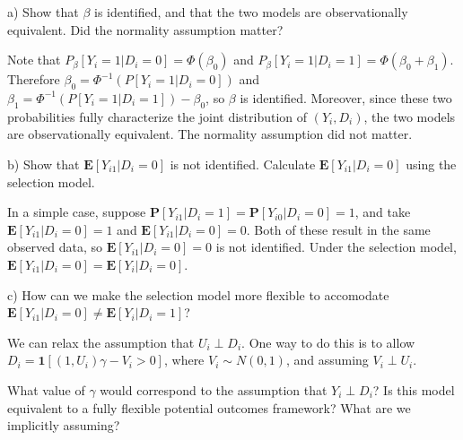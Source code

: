 \documentclass[12pt,english]{article}
\begin{document}
a) Show that $\beta$ is identified, and that the two models are observationally equivalent. Did the normality assumption matter?
\vspace{1em}

Note that $P_{\beta}[Y_{i} = 1 | D_{i} = 0] = \Phi(\beta_{0})$ and $P_{\beta}[Y_{i} = 1 | D_{i} = 1] = \Phi(\beta_{0} + \beta_{1})$. Therefore $\beta_{0} = \Phi^{-1}(P[Y_{i} = 1 | D_{i} = 0])$ and $\beta_{1} = \Phi^{-1}(P[Y_{i} = 1 | D_{i} = 1]) - \beta_{0}$, so $\beta$ is identified. Moreover, since these two probabilities fully characterize the joint distribution of $(Y_{i}, D_{i})$, the two models are observationally equivalent. The normality assumption did not matter.

\vspace{1em}
b) Show that $\mathbf{E}[Y_{i1} | D_{i} = 0]$ is not identified. Calculate $\mathbf{E}[Y_{i1} | D_{i} = 0]$ using the selection model.
\vspace{1em}

In a simple case, suppose $\mathbf{P}[Y_{i1} | D_{i} = 1] = \mathbf{P}[Y_{i0} | D_{i} = 0] = 1$, and take $\mathbf{E}[Y_{i1} | D_{i} = 0] = 1$ and $\mathbf{E}[Y_{i1} | D_{i} = 0] = 0$. Both of these result in the same observed data, so $\mathbf{E}[Y_{i1} | D_{i} = 0] = 0$ is not identified. Under the selection model, $\mathbf{E}[Y_{i1} | D_{i} = 0] = \mathbf{E}[Y_{i} | D_{i} = 0]$.

\vspace{1em}
c) How can we make the selection model more flexible to accomodate $\mathbf{E}[Y_{i1} | D_{i} = 0] \neq \mathbf{E}[Y_{i} | D_{i} = 1]$?
\vspace{1em}

We can relax the assumption that $U_{i} \perp D_{i}$. One way to do this is to allow $D_{i} = \mathbf{1}[ (1, U_{i}) \gamma - V_{i} > 0 ]$, where $V_{i} \sim N(0, 1)$, and assuming $V_{i} \perp U_{i}$.

What value of $\gamma$ would correspond to the assumption that $Y_{i} \perp D_{i}$? Is this model equivalent to a fully flexible potential outcomes framework? What are we implicitly assuming? 
\end{document}
